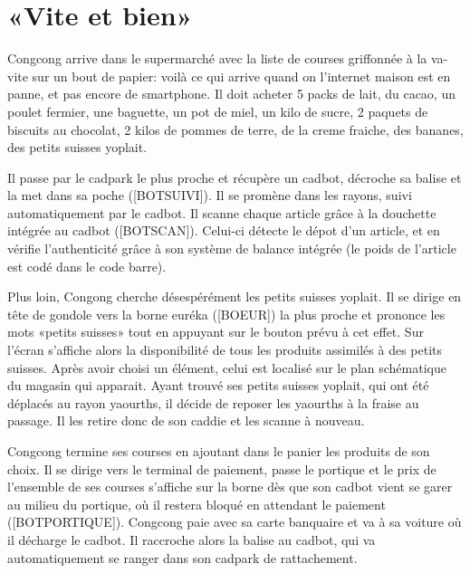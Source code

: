 \section{«Vite et bien»}

Congcong arrive dans le supermarché avec la liste de courses griffonnée à la va-vite sur un bout de papier: voilà ce qui arrive quand on l'internet maison est en panne, et pas encore de smartphone.
Il doit acheter 5 packs de lait, du cacao, un poulet fermier, une baguette, un pot de miel, un kilo de sucre, 2 paquets de biscuits au chocolat, 2 kilos de pommes de terre, de la creme fraiche, des bananes, des petits suisses yoplait.
\par
Il passe par le cadpark le plus proche et récupère un cadbot, décroche sa balise et la met dans sa poche ([BOTSUIVI]).
Il se promène dans les rayons, suivi automatiquement par le cadbot.
Il scanne chaque article grâce à la douchette intégrée au cadbot ([BOTSCAN]).
Celui-ci détecte le dépot d'un article, et en vérifie l'authenticité grâce à son système de balance intégrée (le poids de l'article est codé dans le code barre).
\par
Plus loin, Congong cherche désespérément les petits suisses yoplait.
Il se dirige en tête de gondole vers la borne euréka ([BOEUR]) la plus proche et prononce les mots «petits suisses» tout en appuyant sur le bouton prévu à cet effet.
Sur l'écran s'affiche alors la disponibilité de tous les produits assimilés à des petits suisses.
Après avoir choisi un élément, celui est localisé sur le plan schématique du magasin qui apparait.
Ayant trouvé ses petits suisses yoplait, qui ont été déplacés au rayon yaourths, il décide de reposer les yaourths à la fraise au passage.
Il les retire donc de son caddie et les scanne à nouveau.
\par
Congcong termine ses courses en ajoutant dans le panier les produits de son choix.
Il se dirige vers le terminal de paiement, passe le portique et le prix de l'ensemble de ses courses s'affiche sur la borne dès que son cadbot vient se garer au milieu du portique, où il restera bloqué en attendant le paiement ([BOTPORTIQUE]).
Congcong paie avec sa carte banquaire et va à sa voiture où il décharge le cadbot.
Il raccroche alors la balise au cadbot, qui va automatiquement se ranger dans son cadpark de rattachement.
